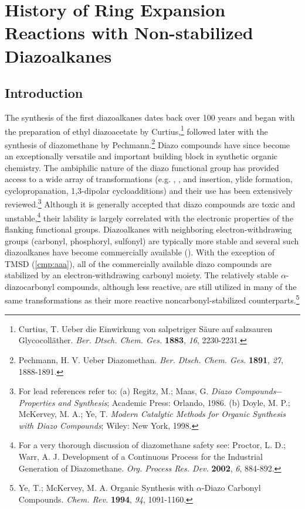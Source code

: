 \captionsetup[figure]{list=no} %

\chapter{History of Ring Expansion Reactions with Non-stabilized Diazoalkanes}
\label{chp:diazobkg}
 \pagebreak
 
\section{Introduction}
\doublespacing The synthesis of the first
diazoalkanes dates back over 100 years and began with the preparation of ethyl diazoacetate by Curtius,\footnote{{\frenchspacing Curtius, T. Ueber die
Einwirkung von salpetriger S\"{a}ure auf salzsauren Glycocoll\"{a}ther. \textit{Ber. Dtsch. Chem.
Ges.} \textbf{1883}, \textit{16}, 2230-2231.}} followed later with the synthesis of diazomethane by
Pechmann.\footnote{{\frenchspacing Pechmann, H. V. Ueber Diazomethan. \textit{Ber. Dtsch. Chem.
Ges.} \textbf{1891}, \textit{27}, 1888-1891.}} Diazo compounds have since become an exceptionally
versatile and important building block in synthetic organic chemistry. The ambiphilic nature of the
diazo functional group has provided access to a wide array of transformations (e.g.
, , and  insertion, ylide formation, cyclopropanation, 1,3-dipolar
cycloadditions) and their use has been extensively reviewed.\footnote{For lead references
refer to: (a) Regitz, M.; Maas, G. \textit{Diazo Compounds$-$Properties and Synthesis}; Academic
Press: Orlando, 1986. (b) Doyle, M. P.; McKervey, M. A.; Ye, T. \textit{Modern Catalytic Methods for
Organic Synthesis with Diazo Compounds}; Wiley: New York, 1998.} Although it is generally accepted
that diazo compounds are toxic and unstable,\footnote{For a very thorough discussion of diazomethane
safety see: {\frenchspacing Proctor, L. D.; Warr, A. J. Development of a Continuous Process for the
Industrial Generation of Diazomethane. \textit{Org. Process Res. Dev.} \textbf{2002}, \textit{6},
884-892.}} their lability is largely correlated with the electronic properties of the flanking
functional groups. Diazoalkanes with neighboring electron-withdrawing groups (carbonyl, phosphoryl,
sulfonyl) are typically more stable and several such diazoalkanes have become commercially
available (). With the exception of
TMSD (\ref{cmp:aaa}), all of the commercially available diazo compounds are stabilized by an
electron-withdrawing carbonyl moiety. The relatively stable $\alpha$-diazocarbonyl compounds, although less reactive, are still utilized in many of the same
transformations as their more reactive noncarbonyl-stabilized counterparts.\footnote{{\frenchspacing
Ye, T.; McKervey, M. A. Organic Synthesis with $\alpha$-Diazo Carbonyl Compounds. \textit{Chem. Rev.}
\textbf{1994},
\textit{94}, 1091-1160.}}

